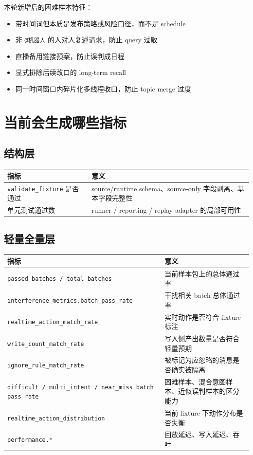 \documentclass[11pt]{article}
\begin{document}
本轮新增后的困难样本特征：
\begin{itemize}
\item 带时间词但本质是发布策略或风险口径，而不是 schedule
\item 非 \texttt{@机器人} 的人对人复述请求，防止 query 过敏
\item 直播备用链接预案，防止误判成日程
\item 显式排除后续改口的 long-term recall
\item 同一时间窗口内碎片化多线程收口，防止 topic merge 过度
\end{itemize}

\section{当前会生成哪些指标}

\subsection{结构层}

\begin{tabularx}{\textwidth}{@{}lX@{}}
\toprule
\textbf{指标} & \textbf{意义} \\
\midrule
\texttt{validate\_fixture} 是否通过 & source/runtime schema、source-only 字段剥离、基本字段完整性 \\
单元测试通过数 & runner / reporting / replay adapter 的局部可用性 \\
\bottomrule
\end{tabularx}

\subsection{轻量全量层}

\begin{tabularx}{\textwidth}{@{}lX@{}}
\toprule
\textbf{指标} & \textbf{意义} \\
\midrule
\texttt{passed\_batches / total\_batches} & 当前样本包上的总体通过率 \\
\texttt{interference\_metrics.batch\_pass\_rate} & 干扰相关 batch 总体通过率 \\
\texttt{realtime\_action\_match\_rate} & 实时动作是否符合 fixture 标注 \\
\texttt{write\_count\_match\_rate} & 写入侧产出数量是否符合轻量预期 \\
\texttt{ignore\_rule\_match\_rate} & 被标记为应忽略的消息是否确实被隔离 \\
\texttt{difficult / multi\_intent / near\_miss batch pass rate} & 困难样本、混合意图样本、近似误判样本的区分能力 \\
\texttt{realtime\_action\_distribution} & 当前 fixture 下动作分布是否失衡 \\
\texttt{performance.*} & 回放延迟、写入延迟、吞吐 \\
\bottomrule
\end{tabularx}
\end{document}
